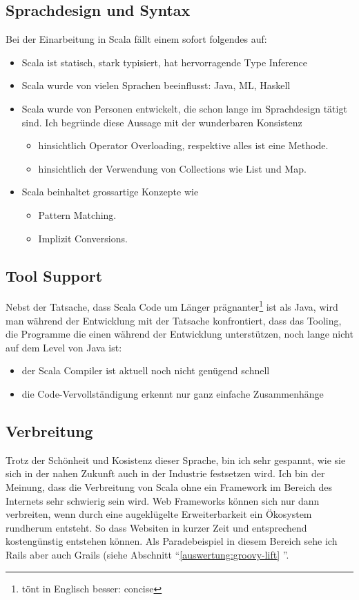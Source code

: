 \subsection{Sprachdesign und Syntax}
Bei der Einarbeitung in Scala f\"allt einem sofort folgendes auf:
\begin{itemize}
\item Scala ist statisch, stark typisiert, hat hervorragende Type Inference
\item Scala wurde von vielen Sprachen beeinflusst: Java, ML, Haskell
\item Scala wurde von Personen entwickelt, die schon lange im Sprachdesign t\"atigt sind. Ich begr\"unde diese Aussage mit der wunderbaren Konsistenz 
\begin{itemize}
\item hinsichtlich Operator Overloading, respektive alles ist eine Methode.
\item hinsichtlich der Verwendung von Collections wie List und Map. 
\end{itemize}
\item Scala beinhaltet grossartige Konzepte wie
\begin{itemize}
\item Pattern Matching.
\item Implizit Conversions.
\end{itemize}
\end{itemize}

\subsection{Tool Support}
Nebst der Tatsache, dass Scala Code um L\"anger pr\"agnanter\footnote{t\"ont in Englisch besser: concise} ist als Java, wird man w\"ahrend der Entwicklung mit der Tatsache konfrontiert, dass das Tooling, die Programme die einen w\"ahrend der Entwicklung unterst\"utzen, noch lange nicht auf dem Level von Java ist: 
\begin{itemize}
\item der Scala Compiler ist aktuell noch nicht gen\"ugend schnell
\item die Code-Vervollst\"andigung erkennt nur ganz einfache Zusammenh\"ange
\end{itemize}

\subsection{Verbreitung}
Trotz der Sch\"onheit und Kosistenz dieser Sprache, bin ich sehr gespannt, wie sie sich in der nahen Zukunft auch in der Industrie festsetzen wird. Ich bin der Meinung, dass die Verbreitung von Scala ohne ein Framework im Bereich des Internets sehr schwierig sein wird. Web Frameworks k\"onnen sich nur dann verbreiten, wenn durch eine augekl\"ugelte Erweiterbarkeit ein \"Okosystem rundherum entsteht. So dass Websiten in kurzer Zeit und entsprechend kosteng\"unstig entstehen k\"onnen. Als Paradebeispiel in diesem Bereich sehe ich Rails aber auch Grails (siehe Abschnitt ``\ref{auswertung:groovy-lift} ''. 



